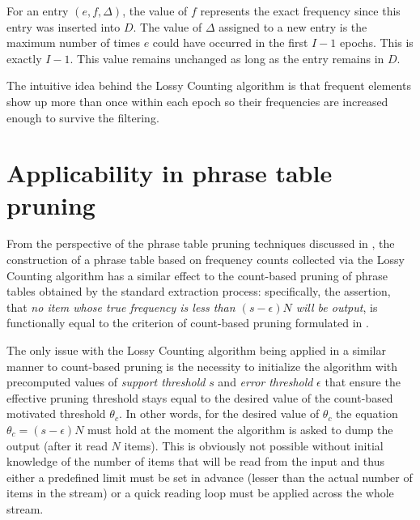 For an entry $(e, f, \Delta)$, the value of $f$ represents the exact frequency
since this entry was inserted into $D$.
The value of $\Delta$ assigned to a new entry is the maximum number of times
$e$ could have occurred in the first $I-1$ epochs. This is exactly $I-1$.
This value remains unchanged as long as the entry remains in $D$.

The intuitive idea behind the Lossy Counting algorithm is that frequent elements
show up more than once within each epoch so their frequencies are increased enough
to survive the filtering.

\section{Applicability in phrase table pruning}
\label{sec:lossy-counting-applicability}

From the perspective of the phrase table pruning techniques discussed in
, the construction of a phrase table based on frequency counts
collected via the Lossy Counting algorithm has a similar effect to the count-based pruning of
phrase tables obtained by the standard extraction process:
specifically, the assertion, that \emph{no item whose true frequency is less than
$(s - \epsilon)N$ will be output}, is functionally equal to the criterion of
count-based pruning formulated in .

The only issue with the Lossy Counting algorithm being applied in a similar manner to
count-based pruning is the necessity to initialize the algorithm with precomputed values of
\emph{support threshold} $s$ and \emph{error threshold} $\epsilon$ that ensure
the effective pruning threshold stays equal to the desired value of the count-based
motivated threshold $\theta_{c}$.
In other words, for the desired value of $\theta_{c}$ the equation $\theta_{c} = (s - \epsilon)N$
must hold at the moment the algorithm is asked to dump the output (after it read $N$ items).
This is obviously not possible without initial knowledge of the number of items
that will be read from the input and thus either a predefined limit must be set in advance
(lesser than the actual number of items in the stream) or a quick reading loop must be applied
across the whole stream.

